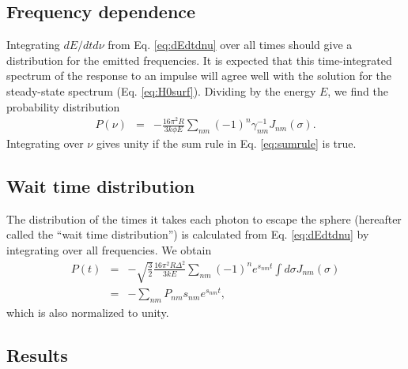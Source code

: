 \documentclass{aastex63}
\newcommand{\be}{\begin{eqnarray}}
\newcommand{\ee}{\end{eqnarray}}
\begin{document}
\subsection{Frequency dependence}

Integrating $dE/dt d\nu$ from Eq. \ref{eq:dEdtdnu} over all times should give a distribution for the emitted frequencies. It is expected that this time-integrated spectrum of the response to an impulse will agree well with the solution for the steady-state spectrum (Eq. \ref{eq:H0surf}). Dividing by the energy $E$, we find the probability distribution
\be \label{eq:spectrum}
P(\nu) & = &  -\frac{16\pi^2 R}{3k\phi E}  \sum_{nm} (-1)^n \gamma_{nm}^{-1} J_{nm}(\sigma).
\ee
Integrating over $\nu$ gives unity if the sum rule in Eq. \ref{eq:sumrule} is true.

\subsection{Wait time distribution}

The distribution of the times it takes each photon to escape the sphere (hereafter called the ``wait time distribution'') is calculated from Eq. \ref{eq:dEdtdnu} by integrating over all frequencies. We obtain
\be
P(t)  & = & - \sqrt{\frac{3}{2}} \frac{16\pi^2 R \Delta^2 }{3kE}     \sum_{nm} (-1)^n  e^{s_{nm}t} \int d\sigma J_{nm}(\sigma) 
\nonumber \\ & = &  - \sum_{nm} P_{nm} s_{nm} e^{s_{nm}t},
\label{eq:waittime}
\ee
which is also normalized to unity.


\subsection{Results}




\acknowledgments
\end{document}
